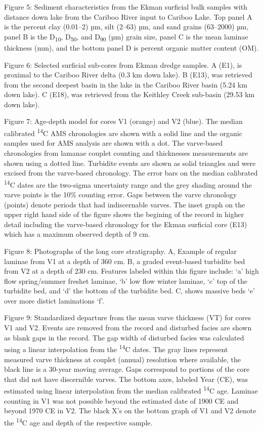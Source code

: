 \documentclass[
  letterpaper,
  DIV=11,
  numbers=noendperiod]{scrartcl}
\begin{document}
Figure 5: Sediment characteristics from the Ekman surficial bulk samples
with distance down lake from the Cariboo River input to Cariboo Lake.
Top panel A is the percent clay (0.01--2) µm, silt (2--63) µm, and sand
grains (63--2000) µm, panel B is the D\textsubscript{10},
D\textsubscript{50}, and D\textsubscript{90} (µm) grain size, panel C is
the mean laminae thickness (mm), and the bottom panel D is percent
organic matter content (OM).

Figure 6: Selected surficial sub-cores from Ekman dredge samples. A
(E1), is proximal to the Cariboo River delta (0.3 km down lake). B
(E13), was retrieved from the second deepest basin in the lake in the
Cariboo River basin (5.24 km down lake). C (E18), was retrieved from the
Keithley Creek sub-basin (29.53 km down lake).

Figure 7: Age-depth model for cores V1 (orange) and V2 (blue). The
median calibrated \textsuperscript{14}C AMS chronologies are shown with
a solid line and the organic samples used for AMS analysis are shown
with a dot. The varve-based chronologies from lamanae couplet counting
and thicknesses measurements are shown using a dotted line. Turbidite
events are shown as solid triangles and were excised from the
varve-based chronology. The error bars on the median calibrated
\textsuperscript{14}C dates are the two-sigma uncertainty range and the
grey shading around the varve points is the 10\% counting error. Gaps
between the varve chronology (points) denote periods that had
indiscernable varves. The inset graph on the upper right hand side of
the figure shows the begining of the record in higher detail including
the varve-based chronology for the Ekman surficial core (E13) which has
a maximum observed depth of 9 cm.

Figure 8: Photographs of the long core stratigraphy. A, Example of
regular laminae from V1 at a depth of 360 cm. B, a graded event-based
turbidite bed from V2 at a depth of 230 cm. Features labeled within this
figure include: `a' high flow spring/summer freshet laminae, `b' low
flow winter laminae, `c' top of the turbidite bed, and `d' the bottom of
the turbidite bed. C, shows massive beds `e' over more distict
laminations `f'.

Figure 9: Standardized departure from the mean varve thickness (VT) for
cores V1 and V2. Events are removed from the record and disturbed facies
are shown as blank gaps in the record. The gap width of disturbed facies
was calculated using a linear interpolation from the
\textsuperscript{14}C dates. The gray lines represent measured varve
thickness at couplet (annual) resolution where available, the black line
is a 30-year moving average. Gaps correspond to portions of the core
that did not have discernible varves. The bottom axes, labeled Year
(CE), was estimated using linear interpolation from the median
calibrated \textsuperscript{14}C age. Laminae counting in V1 was not
possible beyond the estimated date of 1900 CE and beyond 1970 CE in V2.
The black X's on the bottom graph of V1 and V2 denote the
\textsuperscript{14}C age and depth of the respective sample.
\end{document}
